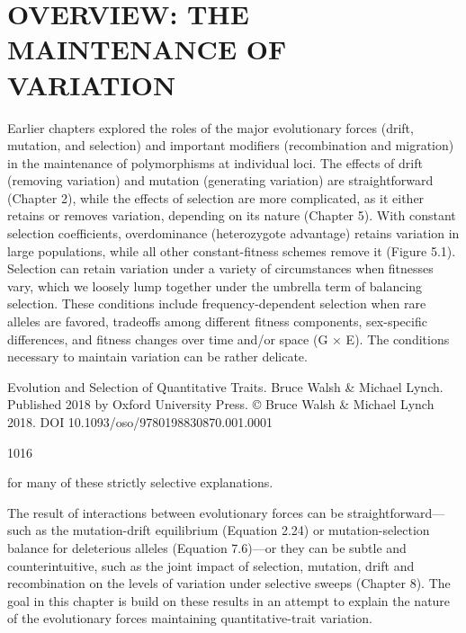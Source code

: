\documentclass{article}
\begin{document}
\section{OVERVIEW: THE MAINTENANCE OF VARIATION}
Earlier chapters explored the roles of the major evolutionary forces (drift, mutation, and selection) and important modifiers (recombination and migration) in the maintenance of polymorphisms at individual loci. The effects of drift (removing variation) and mutation (generating variation) are straightforward (Chapter 2), while the effects of selection are more complicated, as it either retains or removes variation, depending on its nature (Chapter 5). With constant selection coefficients, overdominance (heterozygote advantage) retains variation in large populations, while all other constant-fitness schemes remove it (Figure 5.1). Selection can retain variation under a variety of circumstances when fitnesses vary, which we loosely lump together under the umbrella term of balancing selection. These conditions include frequency-dependent selection when rare alleles are favored, tradeoffs among different fitness components, sex-specific differences, and fitness changes over time and/or space (G × E). The conditions necessary to maintain variation can be rather delicate.

Evolution and Selection of Quantitative Traits. Bruce Walsh & Michael Lynch. Published 2018 by Oxford University Press. © Bruce Walsh & Michael Lynch 2018. DOI 10.1093/oso/9780198830870.001.0001

1016

for many of these strictly selective explanations.

The result of interactions between evolutionary forces can be straightforward—such as the mutation-drift equilibrium (Equation 2.24) or mutation-selection balance for deleterious alleles (Equation 7.6)—or they can be subtle and counterintuitive, such as the joint impact of selection, mutation, drift and recombination on the levels of variation under selective sweeps (Chapter 8). The goal in this chapter is build on these results in an attempt to explain the nature of the evolutionary forces maintaining quantitative-trait variation.
\end{document}
